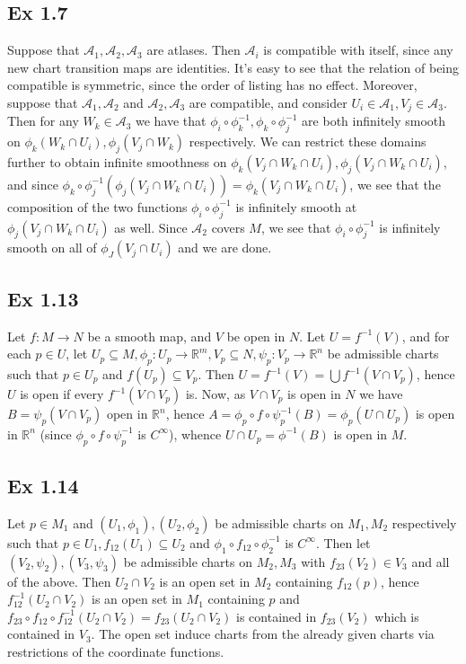 \documentclass{article}
\theoremstyle{definition}
\newcommand{\R}{\mathbb{R}}
\begin{document}
\subsection*{Ex 1.7}

Suppose that $\mathcal{A}_{1}, \mathcal{A}_{2}, \mathcal{A}_{3}$ are atlases.
Then $\mathcal{A}_i$ is compatible with itself, since any new chart transition
maps are identities. It's easy to see that the relation of being compatible is
symmetric, since the order of listing has no effect. Moreover, suppose that
$\mathcal{A}_1, \mathcal{A}_2$ and $\mathcal{A}_2, \mathcal{A}_3$ are
compatible, and consider $U_i \in \mathcal{A}_1, V_j \in \mathcal{A}_3$. Then
for any $W_k \in \mathcal{A}_3$ we have that $\phi_i \circ \phi_k^{-1}, \phi_k
\circ \phi_j^{-1}$ are both infinitely smooth on $\phi_k(W_k \cap U_i),
\phi_j(V_j \cap W_k)$ respectively. We can restrict these domains further to
obtain infinite smoothness on $\phi_k(V_j \cap W_k \cap U_i), \phi_j(V_j \cap
W_k \cap U_i)$, and since $\phi_k \circ \phi_j^{-1}(\phi_j(V_j \cap W_k \cap
U_i)) = \phi_k(V_j \cap W_k \cap U_i)$, we see that the composition of the two
functions $\phi_i \circ \phi_j^{-1}$ is infinitely smooth at $\phi_{j}(V_j \cap
W_k \cap U_i)$ as well. Since $\mathcal{A}_2$ covers $M$, we see that $\phi_i
\circ \phi_j^{-1}$ is infinitely smooth on all of $\phi_J(V_j \cap U_i)$ and we
are done.

\subsection*{Ex 1.13}

Let $f : M \to N$ be a smooth map, and $V$ be open in $N$. Let $U = f^{-1}(V)$,
and for each $p \in U$, let $U_p \subseteq M, \phi_p : U_p \to \R^m, V_p
\subseteq N, \psi_p : V_p \to \R^n$ be admissible charts such that $p \in U_p$
and $f(U_p) \subseteq V_p$. Then $U = f^{-1}(V) = \bigcup f^{-1}(V \cap V_p)$,
hence $U$ is open if every $f^{-1}(V \cap V_p)$ is. Now, as $V \cap V_p$ is
open in $N$ we have $B = \psi_p(V \cap V_p)$ open in $\R^n$, hence $A = \phi_p
\circ f \circ \psi_p^{-1}(B) = \phi_p(U \cap U_p)$ is open in $\R^n$ (since
$\phi_p \circ f \circ \psi_p^{-1}$ is $C^{\infty}$), whence $U \cap U_p =
\phi^{-1}(B)$ is open in $M$.

\subsection*{Ex 1.14}

Let $p \in M_1$ and $(U_1, \phi_1), (U_2, \phi_2)$ be admissible charts on
$M_1, M_2$ respectively such that $p \in U_1, f_{12}(U_1) \subseteq U_2$ and
$\phi_1 \circ f_{12} \circ \phi_2^{-1}$ is $C^{\infty}$. Then let $(V_2,
\psi_2), (V_3, \psi_3)$ be admissible charts on $M_2, M_3$ with $f_{23}(V_2)
\in V_3$ and all of the above. Then $U_2 \cap V_2$ is an open set in $M_2$
containing $f_{12}(p)$, hence $f_{12}^{-1}(U_2 \cap V_2)$ is an open set in
$M_1$ containing $p$ and $f_{23} \circ f_{12} \circ f_{12}^{-1}(U_2 \cap V_2) =
f_{23}(U_2 \cap V_2)$ is contained in $f_{23}(V_2)$ which is contained in
$V_3$. The open set induce charts from the already given charts via
restrictions of the coordinate functions. \\
\end{document}
